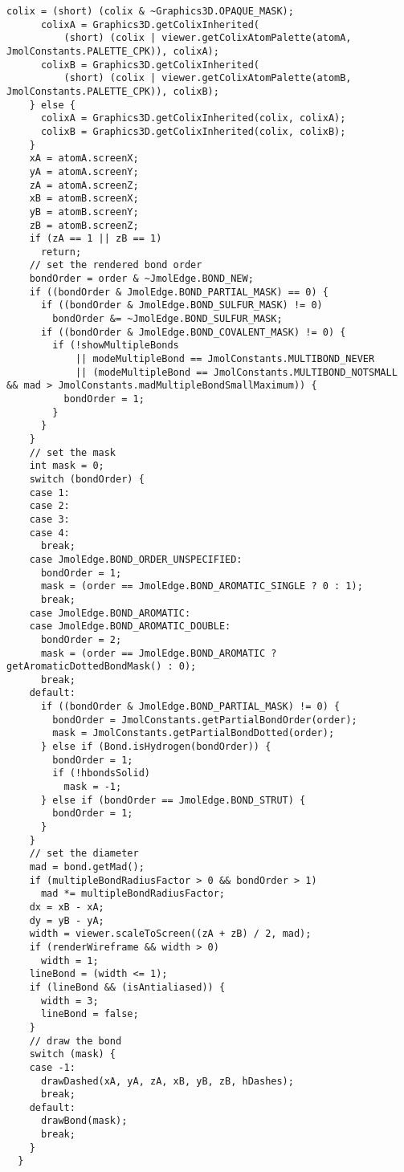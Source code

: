 \begin{lstlisting}[caption={}, label = {code:jmol:SticksRenderer}]
      colix = (short) (colix & ~Graphics3D.OPAQUE_MASK);
      colixA = Graphics3D.getColixInherited(
          (short) (colix | viewer.getColixAtomPalette(atomA, JmolConstants.PALETTE_CPK)), colixA);
      colixB = Graphics3D.getColixInherited(
          (short) (colix | viewer.getColixAtomPalette(atomB, JmolConstants.PALETTE_CPK)), colixB);
    } else {
      colixA = Graphics3D.getColixInherited(colix, colixA);
      colixB = Graphics3D.getColixInherited(colix, colixB);
    }
    xA = atomA.screenX;
    yA = atomA.screenY;
    zA = atomA.screenZ;
    xB = atomB.screenX;
    yB = atomB.screenY;
    zB = atomB.screenZ;
    if (zA == 1 || zB == 1)
      return;
    // set the rendered bond order
    bondOrder = order & ~JmolEdge.BOND_NEW;
    if ((bondOrder & JmolEdge.BOND_PARTIAL_MASK) == 0) {
      if ((bondOrder & JmolEdge.BOND_SULFUR_MASK) != 0)
        bondOrder &= ~JmolEdge.BOND_SULFUR_MASK;
      if ((bondOrder & JmolEdge.BOND_COVALENT_MASK) != 0) {
        if (!showMultipleBonds
            || modeMultipleBond == JmolConstants.MULTIBOND_NEVER
            || (modeMultipleBond == JmolConstants.MULTIBOND_NOTSMALL && mad > JmolConstants.madMultipleBondSmallMaximum)) {
          bondOrder = 1;
        }
      }
    }
    // set the mask
    int mask = 0;
    switch (bondOrder) {
    case 1:
    case 2: 
    case 3:
    case 4:
      break;
    case JmolEdge.BOND_ORDER_UNSPECIFIED:
      bondOrder = 1;
      mask = (order == JmolEdge.BOND_AROMATIC_SINGLE ? 0 : 1);
      break;
    case JmolEdge.BOND_AROMATIC:
    case JmolEdge.BOND_AROMATIC_DOUBLE:
      bondOrder = 2;
      mask = (order == JmolEdge.BOND_AROMATIC ? getAromaticDottedBondMask() : 0);
      break;
    default:
      if ((bondOrder & JmolEdge.BOND_PARTIAL_MASK) != 0) {
        bondOrder = JmolConstants.getPartialBondOrder(order);
        mask = JmolConstants.getPartialBondDotted(order);
      } else if (Bond.isHydrogen(bondOrder)) {
        bondOrder = 1;
        if (!hbondsSolid)
          mask = -1;
      } else if (bondOrder == JmolEdge.BOND_STRUT) {
        bondOrder = 1;
      }
    }
    // set the diameter
    mad = bond.getMad();
    if (multipleBondRadiusFactor > 0 && bondOrder > 1)
      mad *= multipleBondRadiusFactor;
    dx = xB - xA;
    dy = yB - yA;
    width = viewer.scaleToScreen((zA + zB) / 2, mad);
    if (renderWireframe && width > 0)
      width = 1;
    lineBond = (width <= 1);
    if (lineBond && (isAntialiased)) {
      width = 3;
      lineBond = false;
    }
    // draw the bond
    switch (mask) {
    case -1:
      drawDashed(xA, yA, zA, xB, yB, zB, hDashes);
      break;
    default:
      drawBond(mask);
      break;
    }
  }
\end{lstlisting}